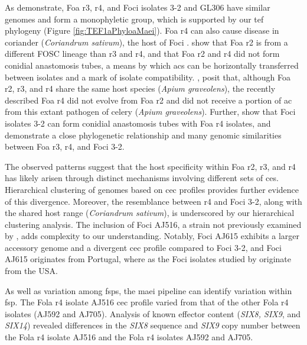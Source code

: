 As \textcite{Henry2020} demonstrate, \ac{Foa} \ac{r3}, \ac{r4}, and \ac{Foci} isolates 3-2 and GL306 have similar genomes and form a monophyletic group, which is supported by our \ac{tef} phylogeny (Figure \ref{fig:TEF1aPhyloaMaei}). \ac{Foa} \ac{r4} can also cause disease in coriander (\textit{Coriandrum sativum}), the host of \ac{Foci} \parencite{Epstein2022}. \textcite{Henry2020, Epstein2022} show that \ac{Foa} \ac{r2} is from a different \ac{FOSC} lineage than \ac{r3} and \ac{r4}, and that \ac{Foa} \ac{r2} and \ac{r4} did not form conidial anastomosis tubes, a means by which \acp{ac} can be horizontally transferred between isolates and a mark of isolate compatibility. \textcite{Epstein2022}, posit that, although \ac{Foa} \ac{r2}, \ac{r3}, and \ac{r4} share the same host species (\textit{Apium graveolens}), the recently described \ac{Foa} \ac{r4} did not evolve from \ac{Foa} \ac{r2} and did not receive a portion of \ac{ac} from this extant pathogen of celery (\textit{Apium graveolens}). Further, \textcite{Epstein2022} show that \ac{Foci} isolates 3-2 can form conidial anastomosis tubes with \ac{Foa} \ac{r4} isolates, and \textcite{Henry2020} demonstrate a close phylogenetic relationship and many genomic similarities between \ac{Foa} \ac{r3}, \ac{r4}, and \ac{Foci} 3-2. 

The observed patterns suggest that the host specificity within \ac{Foa} \ac{r2}, \ac{r3}, and \ac{r4} has likely arisen through distinct mechanisms involving different sets of \acp{ce}. Hierarchical clustering of genomes based on \ac{cec} profiles provides further evidence of this divergence. Moreover, the resemblance between \ac{r4} and \ac{Foci} 3-2, along with the shared host range (\textit{Coriandrum sativum}), is underscored by our hierarchical clustering analysis. The inclusion of \ac{Foci} AJ516, a strain not previously examined by \textcite{Henry2020, Epstein2022}, adds complexity to our understanding. Notably, \ac{Foci} AJ615 exhibits a larger accessory genome and a divergent \ac{cec} profile compared to \ac{Foci} 3-2, and \ac{Foci} AJ615 originates from Portugal, where as the \ac{Foci} isolates studied by \textcite{Henry2020, Epstein2022} originate from the USA. 

As well as variation among \acp{fsp}, the \ac{maei} pipeline can identify variation within \ac{fsp}. The \ac{Fola} \ac{r4} isolate AJ516 \ac{cec} profile varied from that of the other \ac{Fola} \ac{r4} isolates (AJ592 and AJ705). Analysis of known effector content (\textit{SIX8, SIX9}, and \textit{SIX14}) revealed differences in the \textit{SIX8} sequence and \textit{SIX9} copy number between the \ac{Fola} \ac{r4} isolate AJ516 and the \ac{Fola} \ac{r4} isolates AJ592 and AJ705. 

